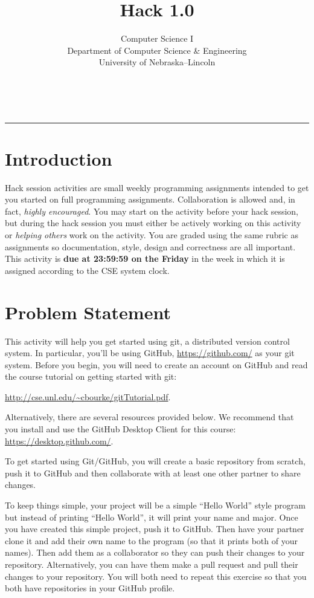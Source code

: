 \documentclass[12pt]{scrartcl}
\title{Hack 1.0}\let\Title\@title
\subtitle{Computer Science I\\
{\small
\vskip1cm
Department of Computer Science \& Engineering \\
University of Nebraska--Lincoln}
\vskip-1cm}
\date{~}
\begin{document}
\maketitle

\hrule

\section*{Introduction}

Hack session activities are small weekly programming assignments intended
to get you started on full programming assignments.  Collaboration is allowed
and, in fact, \emph{highly encouraged}.  You may start on the activity before
your hack session, but during the hack session you must either be actively 
working on this activity or \emph{helping others} work on the activity.
You are graded using the same rubric as assignments so documentation, style, 
design and correctness are all important.  This activity is \textbf{due 
at 23:59:59 on the Friday} in the week in which it is assigned according 
to the CSE system clock.


\section*{Problem Statement}

This activity will help you get started using git, a distributed 
version control system.  In particular, you'll be using GitHub, 
\url{https://github.com/} as your git system.  Before you begin, 
you will need to create an account on GitHub and read the course 
tutorial on getting started with git: 

\url{http://cse.unl.edu/~cbourke/gitTutorial.pdf}.  

Alternatively, there are several resources provided below.  We
recommend that you install and use the GitHub Desktop Client for
this course: \url{https://desktop.github.com/}.

To get started using Git/GitHub, you will create a basic 
repository from scratch, push it to GitHub and then collaborate 
with at least one other partner to share changes.
  
To keep things simple, your project will be a simple ``Hello World'' 
style program but instead of printing ``Hello World'', it will 
print your name and major. Once you have created this simple project, 
push it to GitHub.  Then have your partner clone it and add their own 
name to the program (so that it prints both of your names).  Then
add them as a collaborator so they can push their changes to your
repository.  Alternatively, you can have them make a pull request 
and pull their changes to your repository.  You will both need to 
repeat this exercise so that you both have repositories in your 
GitHub profile.
\end{document}
